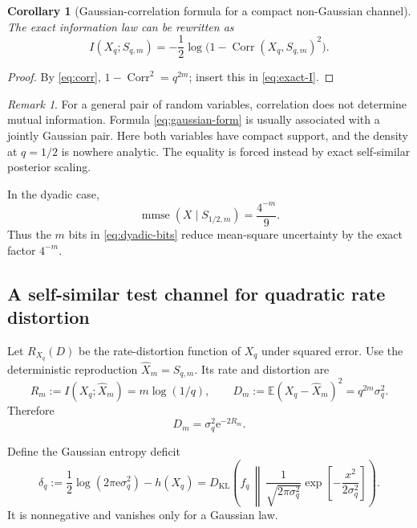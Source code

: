 \documentclass[11pt,oneside]{article}
\newtheorem{corollary}[theorem]{Corollary}
\theoremstyle{definition}
\theoremstyle{remark}
\newtheorem{remark}[theorem]{Remark}
\newcommand{\E}{\mathbb E}
\newcommand{\Corr}{\operatorname{Corr}}
\newcommand{\KL}{D_{\mathrm{KL}}}
\newcommand{\MI}{I}
\newcommand{\mmse}{\operatorname{mmse}}
\newcommand{\e}{\mathrm e}
\begin{document}
\begin{corollary}[Gaussian-correlation formula for a compact non-Gaussian channel]
\label{cor:gaussian-form}
The exact information law can be rewritten as
\begin{equation}
 \boxed{\MI(X_q;S_{q,m})
 =-\frac12\log\bigl(1-\Corr(X_q,S_{q,m})^2\bigr).}
 \label{eq:gaussian-form}
\end{equation}
\end{corollary}

\begin{proof}
By \eqref{eq:corr}, $1-\Corr^2=q^{2m}$; insert this in
\eqref{eq:exact-I}.
\end{proof}

\begin{remark}
For a general pair of random variables, correlation does not determine mutual
information.  Formula \eqref{eq:gaussian-form} is usually associated with a
jointly Gaussian pair.  Here both variables have compact support, and the density
at $q=1/2$ is nowhere analytic.  The equality is forced instead by exact
self-similar posterior scaling.
\end{remark}

In the dyadic case,
\begin{equation}
 \mmse(X\mid S_{1/2,m})=\frac{4^{-m}}9.
 \label{eq:dyadic-mmse}
\end{equation}
Thus the $m$ bits in \eqref{eq:dyadic-bits} reduce mean-square uncertainty by the
exact factor $4^{-m}$.

\subsection{A self-similar test channel for quadratic rate distortion}

Let $R_{X_q}(D)$ be the rate-distortion function of $X_q$ under squared error.
Use the deterministic reproduction $\widehat X_m=S_{q,m}$.  Its rate and
distortion are
\begin{equation}
 R_m:=I(X_q;\widehat X_m)=m\log(1/q),
 \qquad
 D_m:=\E(X_q-\widehat X_m)^2=q^{2m}\sigma_q^2.
 \label{eq:RD-points}
\end{equation}
Therefore
\begin{equation}
 D_m=\sigma_q^2\e^{-2R_m}.
 \label{eq:selfsimilar-RD}
\end{equation}

Define the Gaussian entropy deficit
\begin{equation}
 \delta_q
 :=\frac12\log(2\pi\e\sigma_q^2)-h(X_q)
 =\KL\!\left(f_q\,\middle\|\,
   \frac{1}{\sqrt{2\pi\sigma_q^2}}
   \exp\!\left[-\frac{x^2}{2\sigma_q^2}\right]\right).
 \label{eq:deficit}
\end{equation}
It is nonnegative and vanishes only for a Gaussian law.
\end{document}
